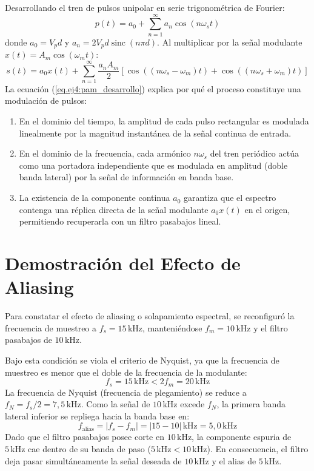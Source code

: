 Desarrollando el tren de pulsos unipolar en serie trigonométrica de Fourier:
\begin{equation}
    p(t) = a_0 + \sum_{n=1}^\infty a_n \cos(n \omega_s t)
    \label{eq.ej4:fourier_tren}
\end{equation}
donde $a_0 = V_p d$ y $a_n = 2 V_p d \operatorname{sinc}(n \pi d)$. Al multiplicar por la señal modulante
$x(t) = A_m \cos(\omega_m t)$:
\begin{equation}
    s(t) = a_0 x(t) + \sum_{n=1}^\infty \frac{a_n A_m}{2} \left[ \cos\left((n \omega_s - \omega_m)t\right) + \cos\left((n \omega_s + \omega_m)t\right) \right]
    \label{eq.ej4:pam_desarrollo}
\end{equation}
La ecuación (\ref{eq.ej4:pam_desarrollo}) explica por qué el proceso constituye una modulación de pulsos:
\begin{enumerate}
    \item En el dominio del tiempo, la amplitud de cada pulso rectangular es modulada linealmente por la magnitud
          instantánea de la señal continua de entrada.
    \item En el dominio de la frecuencia, cada armónico $n \omega_s$ del tren periódico actúa como una portadora
          independiente que es modulada en amplitud (doble banda lateral) por la señal de información en banda base.
    \item La existencia de la componente continua $a_0$ garantiza que el espectro contenga una réplica directa de la
          señal modulante $a_0 x(t)$ en el origen, permitiendo recuperarla con un filtro pasabajos lineal.
\end{enumerate}

\section{Demostración del Efecto de Aliasing}
Para constatar el efecto de aliasing o solapamiento espectral, se reconfiguró la frecuencia de muestreo a
$f_s = 15\,\unit{\kilo\hertz}$, manteniéndose $f_m = 10\,\unit{\kilo\hertz}$ y el filtro pasabajos de $10\,\unit{\kilo\hertz}$.

Bajo esta condición se viola el criterio de Nyquist, ya que la frecuencia de muestreo es menor que el doble de la
frecuencia de la modulante:
\begin{equation*}
    f_s = 15\,\unit{\kilo\hertz} < 2 f_m = 20\,\unit{\kilo\hertz}
\end{equation*}
La frecuencia de Nyquist (frecuencia de plegamiento) se reduce a $f_N = f_s / 2 = 7{,}5\,\unit{\kilo\hertz}$. Como la
señal de $10\,\unit{\kilo\hertz}$ excede $f_N$, la primera banda lateral inferior se repliega hacia la banda base en:
\begin{equation}
    f_{\mathrm{alias}} = |f_s - f_m| = |15 - 10|\,\unit{\kilo\hertz} = 5{,}0\,\unit{\kilo\hertz}
    \label{eq.ej4:f_alias}
\end{equation}
Dado que el filtro pasabajos posee corte en $10\,\unit{\kilo\hertz}$, la componente espuria de $5\,\unit{\kilo\hertz}$
cae dentro de su banda de paso ($5\,\unit{\kilo\hertz} < 10\,\unit{\kilo\hertz}$). En consecuencia, el filtro deja pasar
simultáneamente la señal deseada de $10\,\unit{\kilo\hertz}$ y el alias de $5\,\unit{\kilo\hertz}$.

